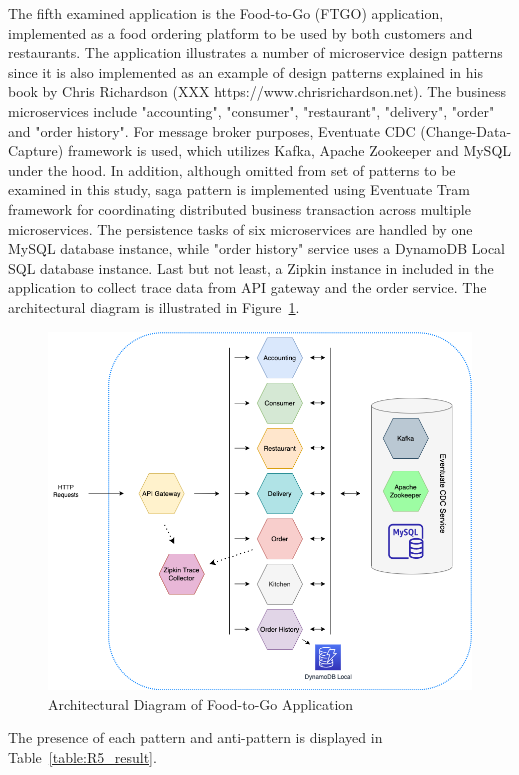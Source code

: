 \documentclass{Configuration_Files/PoliMi3i_thesis}
\begin{document}
The fifth examined application is the Food-to-Go (FTGO) application, implemented as a food ordering platform to be used by both customers and restaurants.
The application illustrates a number of microservice design patterns since it is also implemented as an example of design patterns explained in his book by Chris Richardson (XXX https://www.chrisrichardson.net).
The business microservices include "accounting", "consumer", "restaurant", "delivery", "order" and "order history".
For message broker purposes, Eventuate CDC (Change-Data-Capture) framework is used, which utilizes Kafka, Apache Zookeeper and MySQL under the hood.
In addition, although omitted from set of patterns to be examined in this study, saga pattern is implemented using Eventuate Tram framework for coordinating distributed business transaction across multiple microservices.
The persistence tasks of six microservices are handled by one MySQL database instance, while "order history" service uses a DynamoDB Local SQL database instance.
Last but not least, a Zipkin instance in included in the application to collect trace data from API gateway and the order service.
The architectural diagram is illustrated in Figure~\ref{fig:R5_arch}.

\begin{figure}[H]
\centering
\includegraphics[width=1\textwidth]{myImages/R5.png}
\caption{Architectural Diagram of Food-to-Go Application}
\label{fig:R5_arch}
\end{figure}

The presence of each pattern and anti-pattern is displayed in Table~\ref{table:R5_result}.
\end{document}
